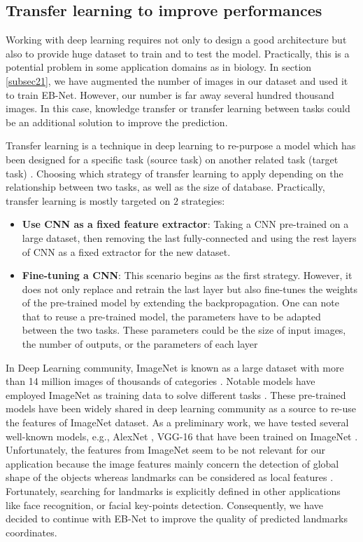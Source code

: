 \documentclass[review]{elsarticle}
\begin{document}
\subsection{Transfer learning to improve performances}
Working with deep learning requires not only to design a good architecture but also to provide huge dataset to train and to test the model. Practically, this is a potential problem in some application domains as in biology. In section \ref{subsec21}, we have augmented the number of images in our dataset and used it to train EB-Net. However, our number is far away several hundred thousand images. In this case, knowledge transfer or transfer learning between tasks could be an additional solution to improve the prediction.

Transfer learning is a technique in deep learning to re-purpose a model which has been designed for a specific task (source task) on another related task (target task) \cite{olivas2009handbook, yosinski2014transferable}. Choosing which strategy of transfer learning to apply depending on the relationship between two tasks, as well as the size of database. Practically, transfer learning is mostly targeted on $2$ strategies:
\begin{itemize}
	\item \textbf{Use CNN as a fixed feature extractor}: Taking a CNN pre-trained on a large dataset, then removing the last fully-connected and using the rest layers of CNN as a fixed extractor for the new dataset.
	\item \textbf{Fine-tuning a CNN}: This scenario begins as the first strategy. However, it does not only replace and retrain the last layer but also fine-tunes the weights of the pre-trained model by extending the backpropagation. One can note that to reuse a pre-trained model, the parameters have to be adapted between the two tasks. These parameters could be the size of input images, the number of outputs, or the parameters of each layer
\end{itemize}

In Deep Learning community, ImageNet is known as a large dataset with more than 14 million images of thousands of categories \cite{deng2009imagenet}. Notable models have employed ImageNet as training data to solve different tasks \cite{krizhevsky2012imagenet, simonyan2014very}. These pre-trained models have been widely shared in deep learning community as a source to re-use the features of ImageNet dataset. As a preliminary work, we have tested several well-known models, e.g., AlexNet \cite{krizhevsky2012imagenet}, VGG-16 \cite{simonyan2014very} that have been trained on ImageNet \cite{deng2009imagenet}. Unfortunately, the features from ImageNet seem to be not relevant for our application because the image features mainly concern the detection of global shape of the objects whereas landmarks can be considered as local features \cite{lin2016homemade}. Fortunately, searching for landmarks is explicitly defined in other applications like face recognition, or facial key-points detection. Consequently, we have decided to continue with EB-Net to improve the quality of predicted landmarks coordinates.
\end{document}
